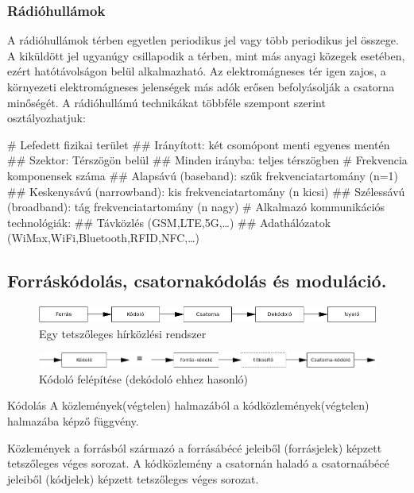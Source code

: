 \subsubsection{Rádióhullámok}
A rádióhullámok térben egyetlen periodikus jel vagy több periodikus jel összege. A kiküldött jel ugyanúgy csillapodik a térben, mint más anyagi közegek esetében, ezért hatótávolságon belül alkalmazható. Az elektromágneses tér igen zajos, a környezeti elektromágneses jelenségek más adók erősen befolyásolják a csatorna minőségét. A rádióhullámú technikákat többféle szempont szerint osztályozhatjuk:
\begin{easylist}[enumerate]
	# Lefedett fizikai terület
	## Irányított: két csomópont menti egyenes mentén
	## Szektor: Térszögön belül
	## Minden irányba: teljes térszögben
	# Frekvencia komponensek száma
	## Alapsávú (baseband): szűk frekvenciatartomány (n=1)
	## Keskenysávú (narrowband): kis frekvenciatartomány (n kicsi)
	## Szélessávú (broadband): tág frekvenciatartomány (n nagy)
	# Alkalmazó kommunikációs technológiák:
	## Távközlés (GSM,LTE,5G,\dots)
	## Adathálózatok (WiMax,WiFi,Bluetooth,RFID,NFC,\dots)
\end{easylist}

\subsection{Forráskódolás, csatornakódolás és moduláció.}
\begin{figure}[h]
	\centering
	\includegraphics[width=0.5\linewidth]{fig/12-hirkozlesi_rendszer}
	\caption{Egy tetszőleges hírközlési rendszer}
	\label{fig:12-hirkozlesirendszer}
\end{figure}
\begin{figure}[h]
	\centering
	\includegraphics[width=0.7\linewidth]{fig/12-kodolo_felepitese}
	\caption{Kódoló felépítése (dekódoló ehhez hasonló)}
	\label{fig:12-kodolofelepitese}
\end{figure}

\begin{definition}{Kódolás}
	A közlemények(végtelen) halmazából a kódközlemények(végtelen) halmazába képző függvény.
\end{definition}
\begin{note}
	Közlemények a forrásból származó a forrásábécé jeleiből (forrásjelek) képzett tetszőleges véges sorozat. A kódközlemény a csatornán haladó a csatornaábécé jeleiből (kódjelek) képzett tetszőleges véges sorozat.
\end{note}
